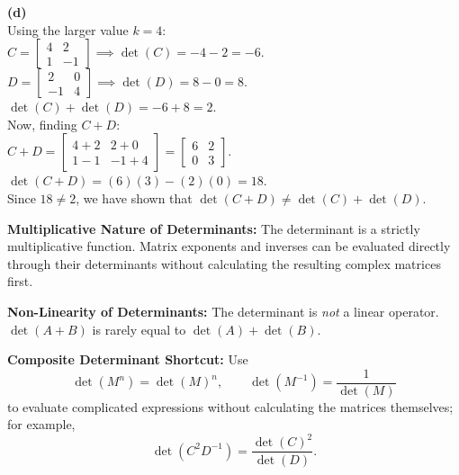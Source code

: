 \begin{solution}
\medskip
\textbf{(d)} \\
Using the larger value $k = 4$: \\
$C = \begin{bmatrix} 4 & 2 \\ 1 & -1 \end{bmatrix} \implies \det(C) = -4 - 2 = -6$. \\
$D = \begin{bmatrix} 2 & 0 \\ -1 & 4 \end{bmatrix} \implies \det(D) = 8 - 0 = 8$. \\
$\det(C) + \det(D) = -6 + 8 = 2$. \\
Now, finding $C+D$: \\
$C+D = \begin{bmatrix} 4+2 & 2+0 \\ 1-1 & -1+4 \end{bmatrix} = \begin{bmatrix} 6 & 2 \\ 0 & 3 \end{bmatrix}$. \\
$\det(C+D) = (6)(3) - (2)(0) = 18$. \\
Since $18 \neq 2$, we have shown that $\det(C+D) \neq \det(C) + \det(D)$.
\end{solution}

\begin{takeaways}
\item \textbf{Multiplicative Nature of Determinants:} The determinant is a strictly multiplicative function. Matrix exponents and inverses can be evaluated directly through their determinants without calculating the resulting complex matrices first.
\item \textbf{Non-Linearity of Determinants:} The determinant is \textit{not} a linear operator. $\det(A+B)$ is rarely equal to $\det(A) + \det(B)$.
\item \textbf{Composite Determinant Shortcut:} Use
\[
\det(M^n)=\det(M)^n,\qquad
\det(M^{-1})=\frac1{\det(M)}
\]
to evaluate complicated expressions without calculating the matrices themselves; for example,
\[
\det(C^2D^{-1})=\frac{\det(C)^2}{\det(D)}.
\]
\end{takeaways}


